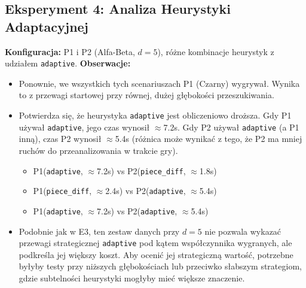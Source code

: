 \documentclass[12pt,a4paper]{article}
\newcommand{\code}[1]{\texttt{#1}} %
\begin{document}
\subsection{Eksperyment 4: Analiza Heurystyki Adaptacyjnej}
\textbf{Konfiguracja:} P1 i P2 (Alfa-Beta, $d=5$), różne kombinacje heurystyk z udziałem \code{adaptive}.
\textbf{Obserwacje:}
\begin{itemize}
    \item Ponownie, we wszystkich tych scenariuszach P1 (Czarny) wygrywał. Wynika to z przewagi startowej przy równej, dużej głębokości przeszukiwania.
    \item Potwierdza się, że heurystyka \code{adaptive} jest obliczeniowo droższa. Gdy P1 używał \code{adaptive}, jego czas wynosił $\approx$7.2s. Gdy P2 używał \code{adaptive} (a P1 inną), czas P2 wynosił $\approx$5.4s (różnica może wynikać z tego, że P2 ma mniej ruchów do przeanalizowania w trakcie gry).
        \begin{itemize}
            \item P1(\code{adaptive}, $\approx$7.2s) vs P2(\code{piece\_diff}, $\approx$1.8s)
            \item P1(\code{piece\_diff}, $\approx$2.4s) vs P2(\code{adaptive}, $\approx$5.4s)
            \item P1(\code{adaptive}, $\approx$7.2s) vs P2(\code{adaptive}, $\approx$5.4s)
        \end{itemize}
    \item Podobnie jak w E3, ten zestaw danych przy $d=5$ nie pozwala wykazać przewagi strategicznej \code{adaptive} pod kątem współczynnika wygranych, ale podkreśla jej większy koszt. Aby ocenić jej strategiczną wartość, potrzebne byłyby testy przy niższych głębokościach lub przeciwko słabszym strategiom, gdzie subtelności heurystyki mogłyby mieć większe znaczenie.
\end{itemize}
\end{document}
